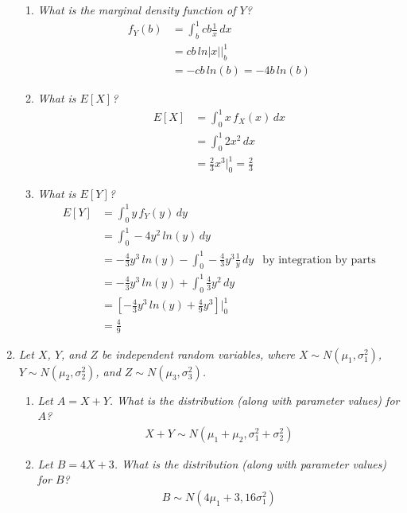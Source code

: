 \documentclass{article} %
\begin{document}
\begin{enumerate}
\begin{enumerate}
		\item \textit{What is the marginal density function of $Y$?}
		\begin{align*}
		f_Y(b) &= \int_{b}^{1} cb\frac{1}{x}\,dx\\
		&= cb\,ln|x| \Big|_{b}^{1}\\
		&= -cb\,ln(b) = -4b\,ln(b)
		\end{align*}
		
		\item \textit{What is $E[X]$?}
		\begin{align*}
		E[X] &= \int_{0}^{1} x\,f_X(x)\,dx\\
		&= \int_{0}^{1} 2x^2\,dx\\
		&= \frac{2}{3} x^3 \Big|_{0}^{1} = \frac{2}{3}
		\end{align*}
		
		\item \textit{What is $E[Y]$?}
		\begin{align*}
		E[Y] &= \int_{0}^{1} y\,f_Y(y)\,dy\\
		&= \int_{0}^{1} -4y^2\,ln(y)\,dy\\
		&= -\frac{4}{3} y^3\,ln(y) - \int_{0}^{1} -\frac{4}{3}y^3\frac{1}{y}\,dy &\text{by integration by parts}\\
		&= -\frac{4}{3} y^3\,ln(y) + \int_{0}^{1} \frac{4}{3}y^2\,dy\\
		&= [-\frac{4}{3} y^3\,ln(y) + \frac{4}{9}y^3]\Big|_{0}^{1}\\
		&= \frac{4}{9}
		\end{align*}
	
	\end{enumerate}
	
	\item \textit{Let $X$, $Y$, and $Z$ be independent random variables, where $X \sim N(\mu_1, \sigma_1^2)$, $Y \sim N(\mu_2, \sigma_2^2)$, and $Z \sim N(\mu_3, \sigma_3^2)$.}
	\begin{enumerate}
		\item \textit{Let $A = X + Y$. What is the distribution (along with parameter values) for $A$?}
		\begin{align*}
		X + Y \sim N(\mu_1 + \mu_2, \sigma_1^2 + \sigma_2^2)
		\end{align*}
		
		\item \textit{Let $B = 4X + 3$. What is the distribution (along with parameter values) for $B$?}
		\begin{align*}
		B \sim N(4\mu_1 + 3, 16\sigma_1^2)
		\end{align*}
		

\end{enumerate}
\end{enumerate}
\end{document}
